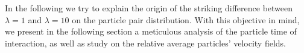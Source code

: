 In the following we try to explain the origin of the striking difference between $\lambda = 1$ and $\lambda = 10$ on the particle pair distribution.
With this objective in mind, we present in the following section a meticulous analysis of the particle time of interaction, as well as study on the relative average particles' velocity fields. 
